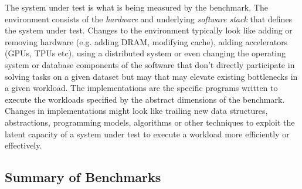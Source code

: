 The system under test is what is being measured by the benchmark. 
The environment consists of the \textit{hardware} and underlying \textit{software stack} that defines the system under test. 
Changes to the environment typically look like adding or removing hardware (e.g. adding DRAM, modifying cache), adding accelerators (GPUs, TPUs etc), using a distributed system or even changing the operating system or database components of the software that don't directly participate in solving tasks on a given dataset but may that may elevate existing bottlenecks in a given workload.
The implementations are the specific programs written to execute the workloads specified by the abstract dimensions of the benchmark. 
Changes in implementations might look like trailing new data structures, abstractions, programming models, algorithms or other techniques to exploit the latent capacity of a system under test to execute a workload more efficiently or effectively. 




\subsection{Summary of Benchmarks}






